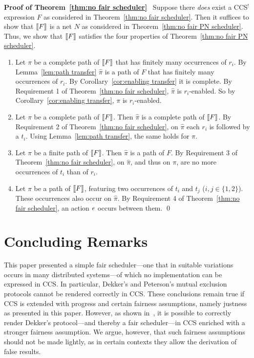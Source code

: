 \documentclass[smallcondensed]{svjour3}
\newcommand{\Thm}[1]{Theorem~\ref{thm:#1}}
\newcommand{\Cor}[1]{Corollary~\ref{cor:#1}}
\newcommand{\Lem}[1]{Lemma~\ref{lem:#1}}
\newcounter {part}
\begin{document}
\noindent
\textbf{Proof of \Thm{no fair scheduler}}~
Suppose there \emph{does} exist a CCS$^!$ expression $F$ as considered in \Thm{no fair scheduler}.
Then it suffices to show that $[\hspace{-1.4pt}[F]\hspace{-1.4pt}]$ is a net $N$ as considered in \Thm{no fair PN scheduler}.
Thus, we show that $[\hspace{-1.4pt}[F]\hspace{-1.4pt}]$ satisfies the four properties of \Thm{no fair PN scheduler}.
\begin{enumerate}
\item Let $\pi$ be a complete path of $[\hspace{-1.4pt}[F]\hspace{-1.4pt}]$ that has finitely many occurrences of $r_i$.
  By \Lem{path transfer} $\widehat\pi$ is a path of $F$ that has finitely many occurrences of $r_i$.
  By \Cor{enabling transfer} it is complete. By Requirement 1 of \Thm{no fair scheduler}, $\widehat\pi$
  is $r_i$-enabled. So by \Cor{enabling transfer}, $\pi$ is $r_i$-enabled.
\item Let $\pi$ be a complete path of $[\hspace{-1.4pt}[F]\hspace{-1.4pt}]$. Then $\widehat\pi$ is a complete path of $[\hspace{-1.4pt}[F]\hspace{-1.4pt}]$.
  By Requirement 2 of \Thm{no fair scheduler}, on $\widehat\pi$ each $r_i$ is followed by a $t_i$.
  Using \Lem{path transfer}, the same holds for $\pi$.
\item Let $\pi$ be a finite path of $[\hspace{-1.4pt}[F]\hspace{-1.4pt}]$.
  Then $\widehat\pi$ is a path of $F$.
  By Requirement 3 of \Thm{no fair scheduler}, on $\widehat\pi$, and thus on $\pi$, are no
  more occurrences of $t_i$ than of $r_i$.
\item Let $\pi$ be a path of $[\hspace{-1.4pt}[F]\hspace{-1.4pt}]$, featuring two occurrences of $t_i$ and $t_j$ ($i,j\in\{1,2\}$).
  These occurrences also occur on $\widehat\pi$.
  By Requirement 4 of \Thm{no fair scheduler}, an action $e$ occurs between them.
\qed
\end{enumerate}

\section{Concluding Remarks}\label{sec:conclusion} 
\newcommand{\prio}{\mathbin{\rhd}}
This paper presented a simple fair scheduler---one that in suitable variations occurs in many
distributed systems---of which no implementation can be expressed in CCS\@.
In particular, Dekker's and Peterson's mutual exclusion protocols cannot be rendered correctly in CCS.
These conclusions remain true if CCS is extended with progress and certain fairness assumptions, namely justness as presented in this paper.
However, as shown in~\cite{CorradiniEtAl09}, it is possible to correctly render Dekker's
protocol---and thereby a fair scheduler---in CCS enriched with a stronger fairness assumption. 
We argue, however, that such fairness assumptions should not be made lightly, as in certain contexts they
allow the derivation of false results.
\end{document}
